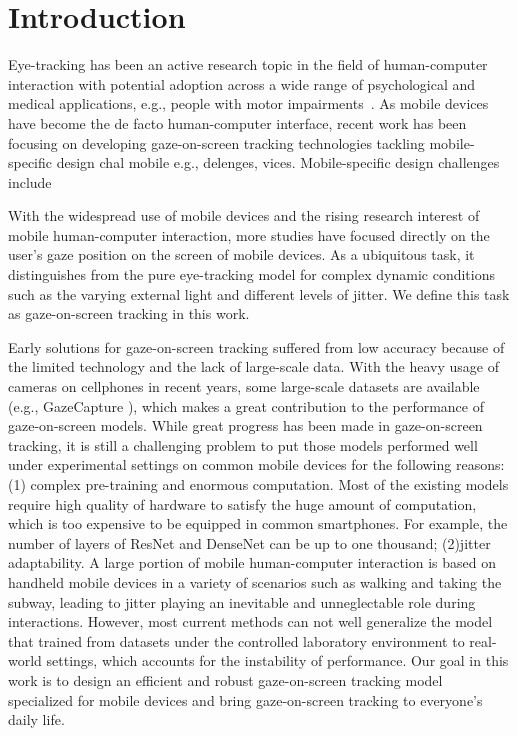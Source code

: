 \documentclass[acmlarge]{acmart}
\begin{document}
\section{Introduction}
Eye-tracking has been an active research topic in the field of human-computer interaction with potential adoption across a wide range of psychological and medical applications, e.g., people with motor impairments~\cite{}. As mobile devices have become the de facto human-computer interface, recent work has been focusing on developing gaze-on-screen tracking technologies tackling mobile-specific design chal mobile e.g., delenges, vices. Mobile-specific design challenges include 

With the widespread use of mobile devices and the rising research interest of mobile human-computer interaction, more studies have focused directly on the user's gaze position on the screen of mobile devices. As a ubiquitous task, it distinguishes from the pure eye-tracking model for complex dynamic conditions such as the varying external light and different levels of jitter. We define this task as gaze-on-screen tracking in this work. 

Early solutions for gaze-on-screen tracking suffered from low accuracy because of the limited technology and the lack of large-scale data. With the heavy usage of cameras on cellphones in recent years, some large-scale datasets are available (e.g., GazeCapture \cite{krafka2016eye}), which makes a great contribution to the performance of gaze-on-screen models. While great progress has been made in gaze-on-screen tracking, it is still a challenging problem to put those models performed well under experimental settings on common mobile devices for the following reasons: (1) complex pre-training and enormous computation. Most of the existing models require high quality of hardware to satisfy the huge amount of computation, which is too expensive to be equipped in common smartphones. For example, the number of layers of ResNet \cite{he2016deep} and DenseNet \cite{huang2017densely} can be up to one thousand; (2)jitter adaptability. A large portion of mobile human-computer interaction is based on handheld mobile devices in a variety of scenarios such as walking and taking the subway, leading to jitter playing an inevitable and unneglectable role during interactions. However, most current methods can not well generalize the model that trained from datasets under the controlled laboratory environment to real-world settings, which accounts for the instability of performance. Our goal in this work is to design an efficient and robust gaze-on-screen tracking model specialized for mobile devices and bring gaze-on-screen tracking to everyone's daily life.
\end{document}
